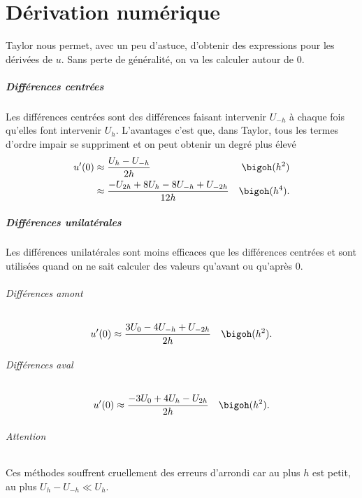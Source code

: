 \part{Dérivation numérique}
Taylor nous permet, avec un peu d'astuce, d'obtenir des
expressions pour les dérivées de $u$.
Sans perte de généralité, on va les calculer autour de 0.

\subsubsection{Différences centrées}
Les différences centrées sont des différences faisant
intervenir $U_{-h}$ à chaque fois qu'elles font intervenir $U_{h}$.
L'avantages c'est que, dans Taylor, tous les termes d'ordre impair
se suppriment et on peut obtenir un degré plus élevé
\begin{align*}
  u'(0) & \approx \frac{U_h - U_{-h}}{2h} & \bigoh(h^2)\\
  & \approx \frac{-U_{2h} + 8U_h - 8U_{-h} + U_{-2h}}{12h} & \bigoh(h^4).
\end{align*}

\subsubsection{Différences unilatérales}
Les différences unilatérales sont moins efficaces que les différences
centrées et sont utilisées quand on ne sait calculer des valeurs qu'avant
ou qu'après 0.

\paragraph{Différences amont}
\begin{align*}
  u'(0) & \approx \frac{3U_0 - 4U_{-h} + U_{-2h}}{2h} & \bigoh(h^2).
\end{align*}

\paragraph{Différences aval}
\begin{align*}
  u'(0) & \approx \frac{-3U_0 + 4U_{h} - U_{2h}}{2h} & \bigoh(h^2).
\end{align*}

\paragraph{Attention}
Ces méthodes souffrent cruellement des erreurs d'arrondi
car au plus $h$ est petit, au plus $U_h - U_{-h} \ll U_h$.

